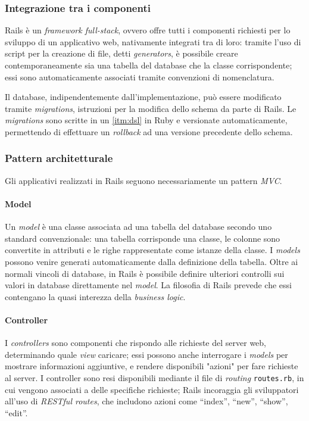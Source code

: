 \subsubsection{Integrazione tra i componenti}
Rails è un \textit{framework full-stack}, ovvero offre tutti i componenti richiesti per lo sviluppo di un applicativo web, nativamente integrati tra di loro: tramite l'uso di script per la creazione di file, detti \textit{generators}, è possibile creare contemporaneamente sia una tabella del database che la classe corrispondente; essi sono automaticamente associati tramite convenzioni di nomenclatura. 

Il database, indipendentemente dall'implementazione, può essere modificato tramite \textit{migrations}, istruzioni per la modifica dello schema da parte di Rails. Le \textit{migrations} sono scritte in un \ref{itm:dsl} in Ruby e versionate automaticamente, permettendo di effettuare un \textit{rollback} ad una versione precedente dello schema.
 
\subsubsection{Pattern architetturale}
Gli applicativi realizzati in Rails seguono necessariamente un pattern \textit{MVC}.
\paragraph{Model}
Un \textit{model} è una classe associata ad una tabella del database secondo uno standard convenzionale: una tabella corrisponde una classe, le colonne sono convertite in attributi e le righe rappresentate come istanze della classe. I \textit{models} possono venire generati automaticamente dalla definizione della tabella. Oltre ai normali vincoli di database, in Rails è possibile definire ulteriori controlli sui valori in database direttamente nel \textit{model}. La filosofia di Rails prevede che essi contengano la quasi interezza della \textit{business logic}.

\paragraph{Controller}
I \textit{controllers} sono componenti che rispondo alle richieste del server web, determinando quale \textit{view} caricare; essi possono anche interrogare i \textit{models} per mostrare informazioni aggiuntive, e rendere disponibili "azioni" per fare richieste al server. I controller sono resi disponibili mediante il file di \textit{routing} \texttt{routes.rb}, in cui vengono associati a delle specifiche richieste; Rails incoraggia gli sviluppatori all'uso di \textit{RESTful routes}, che includono azioni come ``index'', ``new'', ``show'', ``edit''.

